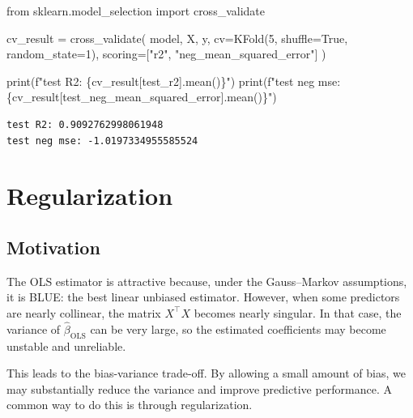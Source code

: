 \documentclass[
  letterpaper,
  DIV=11,
  numbers=noendperiod]{scrreprt}
\newenvironment{Shaded}{\begin{snugshade}}{\end{snugshade}}
\newcommand{\BuiltInTok}[1]{\textcolor[rgb]{0.00,0.23,0.31}{#1}}
\newcommand{\DecValTok}[1]{\textcolor[rgb]{0.68,0.00,0.00}{#1}}
\newcommand{\ImportTok}[1]{\textcolor[rgb]{0.00,0.46,0.62}{#1}}
\newcommand{\NormalTok}[1]{\textcolor[rgb]{0.00,0.23,0.31}{#1}}
\newcommand{\OperatorTok}[1]{\textcolor[rgb]{0.37,0.37,0.37}{#1}}
\newcommand{\SpecialCharTok}[1]{\textcolor[rgb]{0.37,0.37,0.37}{#1}}
\newcommand{\SpecialStringTok}[1]{\textcolor[rgb]{0.13,0.47,0.30}{#1}}
\newcommand{\StringTok}[1]{\textcolor[rgb]{0.13,0.47,0.30}{#1}}
\newcommand{\VariableTok}[1]{\textcolor[rgb]{0.07,0.07,0.07}{#1}}
\newcommand{\ols}{\mathrm{OLS}}
\theoremstyle{definition}
\theoremstyle{definition}
\theoremstyle{plain}
\theoremstyle{plain}
\theoremstyle{remark}
\begin{document}
\begin{Shaded}
\begin{Highlighting}[]
\ImportTok{from}\NormalTok{ sklearn.model\_selection }\ImportTok{import}\NormalTok{ cross\_validate}

\NormalTok{cv\_result }\OperatorTok{=}\NormalTok{ cross\_validate(}
\NormalTok{    model, X, y, cv}\OperatorTok{=}\NormalTok{KFold(}\DecValTok{5}\NormalTok{, shuffle}\OperatorTok{=}\VariableTok{True}\NormalTok{, random\_state}\OperatorTok{=}\DecValTok{1}\NormalTok{), scoring}\OperatorTok{=}\NormalTok{[}\StringTok{"r2"}\NormalTok{, }\StringTok{"neg\_mean\_squared\_error"}\NormalTok{]}
\NormalTok{)}

\BuiltInTok{print}\NormalTok{(}\SpecialStringTok{f"test R2: }\SpecialCharTok{\{}\NormalTok{cv\_result[}\StringTok{\textquotesingle{}test\_r2\textquotesingle{}}\NormalTok{]}\SpecialCharTok{.}\NormalTok{mean()}\SpecialCharTok{\}}\SpecialStringTok{"}\NormalTok{)}
\BuiltInTok{print}\NormalTok{(}\SpecialStringTok{f"test neg mse: }\SpecialCharTok{\{}\NormalTok{cv\_result[}\StringTok{\textquotesingle{}test\_neg\_mean\_squared\_error\textquotesingle{}}\NormalTok{]}\SpecialCharTok{.}\NormalTok{mean()}\SpecialCharTok{\}}\SpecialStringTok{"}\NormalTok{)}
\end{Highlighting}
\end{Shaded}

\begin{verbatim}
test R2: 0.9092762998061948
test neg mse: -1.0197334955585524
\end{verbatim}

\chapter{Regularization}\label{regularization}

\section{Motivation}\label{motivation}

The OLS estimator is attractive because, under the Gauss--Markov
assumptions, it is BLUE: the best linear unbiased estimator. However,
when some predictors are nearly collinear, the matrix \(X^\top X\)
becomes nearly singular. In that case, the variance of
\(\hat\beta_{\ols}\) can be very large, so the estimated coefficients
may become unstable and unreliable.

This leads to the bias-variance trade-off. By allowing a small amount of
bias, we may substantially reduce the variance and improve predictive
performance. A common way to do this is through regularization.
\end{document}

